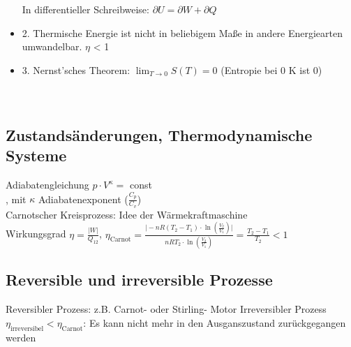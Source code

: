 \documentclass[fs, footer]{latex4ei}
\begin{document}
\begin{multicols*}{4}
\begin{itemize}
In differentieller Schreibweise: $\partial U = \partial W + \partial Q $\\
\item 2. Thermische Energie ist nicht in beliebigem Maße in andere Energiearten umwandelbar. $\eta$ < 1
\item 3. Nernst'sches Theorem: $\lim_{T \rightarrow 0} S(T) = 0$ (Entropie bei 0 K ist 0)\\
\\
\\
\end{itemize}
\subsection{Zustandsänderungen, Thermodynamische Systeme}
Adiabatengleichung $p\cdot V^\kappa =$ const\\, mit $\kappa$ Adiabatenexponent ($\frac{C_p}{C_v}$)\\
Carnotscher Kreisprozess: Idee der Wärmekraftmaschine\\
Wirkungsgrad $\eta = \frac{\vert W\vert}{Q_{12}}$, $\eta_{\text{Carnot}} = \frac{\vert - n R(T_2-T_1)\cdot\ln(\frac{V_2}{V_1})\vert}{n RT_2\cdot\ln(\frac{V_2}{V_1})} = \frac{T_2-T_1}{T_2} < 1$\\
\subsection{Reversible und irreversible Prozesse}
Reversibler Prozess: z.B. Carnot- oder Stirling- Motor %
Irreversibler Prozess $\eta_{\text{irreversibel}} < \eta_{\text{Carnot}}$: Es kann nicht mehr in den Ausganszustand zurückgegangen werden\\


\end{multicols*}
\end{document}
